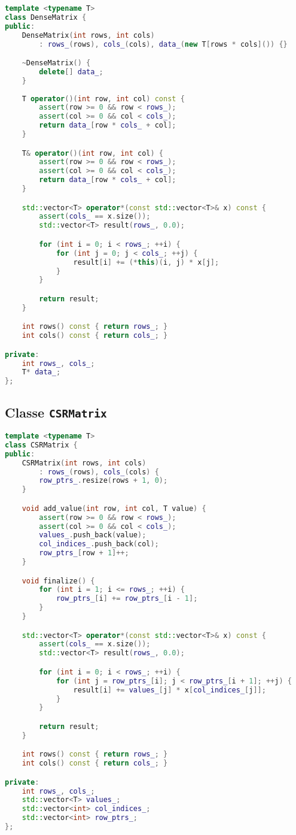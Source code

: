 \documentclass[a4paper,14pt]{article}
\begin{document}
\begin{lstlisting}[language=C++]
template <typename T>
class DenseMatrix {
public:
    DenseMatrix(int rows, int cols)
        : rows_(rows), cols_(cols), data_(new T[rows * cols]()) {}

    ~DenseMatrix() {
        delete[] data_;
    }
    
    T operator()(int row, int col) const {
        assert(row >= 0 && row < rows_);
        assert(col >= 0 && col < cols_);
        return data_[row * cols_ + col];
    }

    T& operator()(int row, int col) {
        assert(row >= 0 && row < rows_);
        assert(col >= 0 && col < cols_);
        return data_[row * cols_ + col];
    }

    std::vector<T> operator*(const std::vector<T>& x) const {
        assert(cols_ == x.size());
        std::vector<T> result(rows_, 0.0);

        for (int i = 0; i < rows_; ++i) {
            for (int j = 0; j < cols_; ++j) {
                result[i] += (*this)(i, j) * x[j];
            }
        }

        return result;
    }

    int rows() const { return rows_; }
    int cols() const { return cols_; }

private:
    int rows_, cols_;
    T* data_;
};
\end{lstlisting}

\subsection*{Classe \texttt{CSRMatrix}}

\begin{lstlisting}[language=C++]
template <typename T>
class CSRMatrix {
public:
    CSRMatrix(int rows, int cols)
        : rows_(rows), cols_(cols) {
        row_ptrs_.resize(rows + 1, 0);
    }

    void add_value(int row, int col, T value) {
        assert(row >= 0 && row < rows_);
        assert(col >= 0 && col < cols_);
        values_.push_back(value);
        col_indices_.push_back(col);
        row_ptrs_[row + 1]++;
    }

    void finalize() {
        for (int i = 1; i <= rows_; ++i) {
            row_ptrs_[i] += row_ptrs_[i - 1];
        }
    }

    std::vector<T> operator*(const std::vector<T>& x) const {
        assert(cols_ == x.size());
        std::vector<T> result(rows_, 0.0);

        for (int i = 0; i < rows_; ++i) {
            for (int j = row_ptrs_[i]; j < row_ptrs_[i + 1]; ++j) {
                result[i] += values_[j] * x[col_indices_[j]];
            }
        }

        return result;
    }

    int rows() const { return rows_; }
    int cols() const { return cols_; }

private:
    int rows_, cols_;
    std::vector<T> values_;
    std::vector<int> col_indices_;
    std::vector<int> row_ptrs_;
};
\end{lstlisting}
\end{document}
